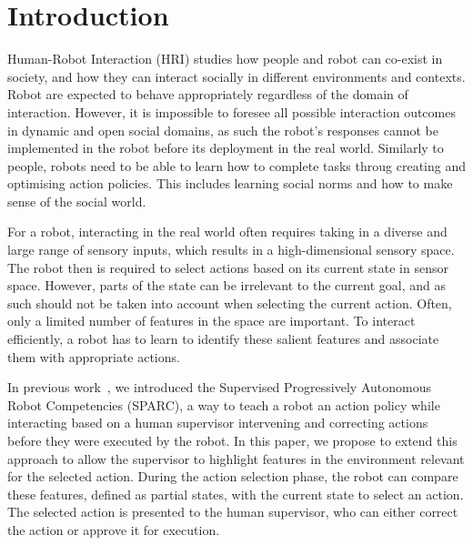 \documentclass[letterpaper]{article} %
\begin{document}
\section{Introduction}

Human-Robot Interaction (HRI) studies how people and robot can co-exist in
 society, and how they can interact socially in different environments and
 contexts. Robot are expected to behave appropriately regardless of the domain
 of interaction. However, it is impossible to foresee all possible interaction
 outcomes in dynamic and open social domains, as such the robot's responses
 cannot be implemented in the robot before its deployment in the real world.
 Similarly to  people, robots need to be able to learn how to complete tasks
 throug creating and optimising action policies. This includes learning social
 norms and how to make sense of the social world.

For a robot, interacting in the real world often requires taking in a diverse
 and large range of sensory inputs, which results in a high-dimensional sensory
 space. The robot then is required to select actions based on its current state
 in sensor space. However, parts of the state can be irrelevant to the current
 goal, and as such should not be taken into account when selecting the current
 action. Often, only a limited number of features in the space are important. To
 interact efficiently, a robot has to learn to identify these salient features
 and associate them with appropriate actions.


In previous work~\cite{senft2015sparc,senft2017supervised}, we introduced the
Supervised Progressively Autonomous Robot Competencies (SPARC), a way to teach a
robot an action policy while interacting based on a human supervisor intervening
and correcting actions before they were executed by the robot. In this paper, we
propose to extend this approach to allow the supervisor to highlight features in
the environment relevant for the selected action. During the action selection
phase, the robot can compare these features, defined as partial states, with the
current state to select an action. The selected action is presented to the human
supervisor, who can either correct the action or approve it for execution.
\end{document}
